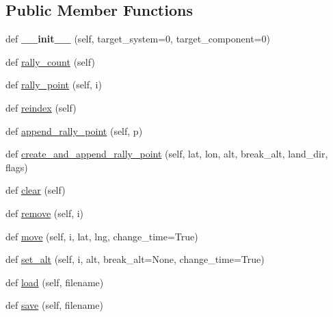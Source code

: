 \subsection*{Public Member Functions}
\begin{DoxyCompactItemize}
\item 
\mbox{\label{classpymavlink_1_1mavwp_1_1MAVRallyLoader_a566bf2ce40fb10c41cbe6265ca84671b}} 
def {\bfseries \+\_\+\+\_\+init\+\_\+\+\_\+} (self, target\+\_\+system=0, target\+\_\+component=0)
\item 
def \hyperlink{classpymavlink_1_1mavwp_1_1MAVRallyLoader_ac740bccce1976db42e9dbbced54fb8ed}{rally\+\_\+count} (self)
\item 
def \hyperlink{classpymavlink_1_1mavwp_1_1MAVRallyLoader_a734094aad4618eef743ee42b33495537}{rally\+\_\+point} (self, i)
\item 
def \hyperlink{classpymavlink_1_1mavwp_1_1MAVRallyLoader_a727649ff011c06cb84d8dd9bce24f30e}{reindex} (self)
\item 
def \hyperlink{classpymavlink_1_1mavwp_1_1MAVRallyLoader_a1ba9e108ed71efde9f721482f713f971}{append\+\_\+rally\+\_\+point} (self, p)
\item 
def \hyperlink{classpymavlink_1_1mavwp_1_1MAVRallyLoader_a34fca935daac50b5e47783e823091c37}{create\+\_\+and\+\_\+append\+\_\+rally\+\_\+point} (self, lat, lon, alt, break\+\_\+alt, land\+\_\+dir, flags)
\item 
def \hyperlink{classpymavlink_1_1mavwp_1_1MAVRallyLoader_a7dced4f8b93c4dd55993fb889c65cf25}{clear} (self)
\item 
def \hyperlink{classpymavlink_1_1mavwp_1_1MAVRallyLoader_a91cb8625b32871e2dea3d54bc755db5a}{remove} (self, i)
\item 
def \hyperlink{classpymavlink_1_1mavwp_1_1MAVRallyLoader_a42e1d8a77c00ac327e9438a5439f5778}{move} (self, i, lat, lng, change\+\_\+time=True)
\item 
def \hyperlink{classpymavlink_1_1mavwp_1_1MAVRallyLoader_a042fd3f1689362390b346e41ac8323dc}{set\+\_\+alt} (self, i, alt, break\+\_\+alt=None, change\+\_\+time=True)
\item 
def \hyperlink{classpymavlink_1_1mavwp_1_1MAVRallyLoader_aa6e38565a5644b7e5d1cc7dddd3b04cd}{load} (self, filename)
\item 
def \hyperlink{classpymavlink_1_1mavwp_1_1MAVRallyLoader_a58865ecbab82b1c707e53d1427cf53b4}{save} (self, filename)
\end{DoxyCompactItemize}
